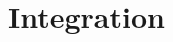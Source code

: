 \documentclass[main.tex]{subfiles}
\begin{document}
\section{Integration}
\begin{multicols}{2}

\end{multicols}
\end{document}
